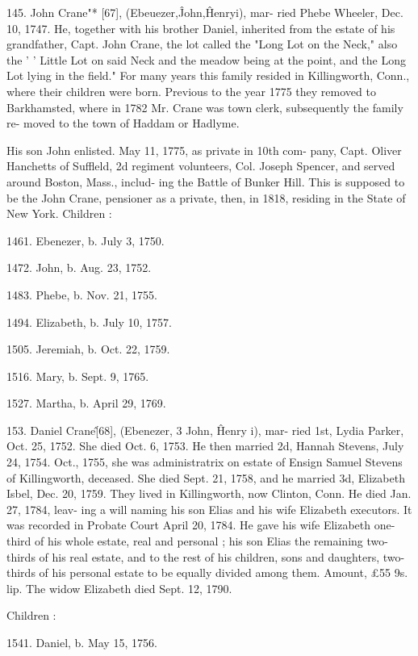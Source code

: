145. John Crane"* [67], (Ebeuezer,\^ John,\^ Henryi), mar- 
ried Phebe Wheeler, Dec. 10, 1747. He, together with his brother 
Daniel, inherited from the estate of his grandfather, Capt. John 
Crane, the lot called the "Long Lot on the Neck," also the 
' ' Little Lot on said Neck and the meadow being at the point, and 
the Long Lot lying in the field." For many years this family 
resided in Killingworth, Conn., where their children were born. 
Previous to the year 1775 they removed to Barkhamsted, where 
in 1782 Mr. Crane was town clerk, subsequently the family re- 
moved to the town of Haddam or Hadlyme. 

His son John enlisted. May 11, 1775, as private in 10th com- 
pany, Capt. Oliver Hanchetts of Suffleld, 2d regiment volunteers, 
Col. Joseph Spencer, and served around Boston, Mass., includ- 
ing the Battle of Bunker Hill. This is supposed to be the John 
Crane, pensioner as a private, then, in 1818, residing in the State 
of New York. Children : 

1461. Ebenezer, b. July 3, 1750. 

1472. John, b. Aug. 23, 1752. 

1483. Phebe, b. Nov. 21, 1755. 

1494. Elizabeth, b. July 10, 1757. 

1505. Jeremiah, b. Oct. 22, 1759. 

1516. Mary, b. Sept. 9, 1765. 

1527. Martha, b. April 29, 1769. 

153. Daniel Crane\^ [68], (Ebenezer, 3 John, \^ Henry i), mar- 
ried 1st, Lydia Parker, Oct. 25, 1752. She died Oct. 6, 1753. 
He then married 2d, Hannah Stevens, July 24, 1754. Oct., 
1755, she was administratrix on estate of Ensign Samuel Stevens 
of Killingworth, deceased. She died Sept. 21, 1758, and he 
married 3d, Elizabeth Isbel, Dec. 20, 1759. They lived in 
Killingworth, now Clinton, Conn. He died Jan. 27, 1784, leav- 
ing a will naming his son Elias and his wife Elizabeth executors. 
It was recorded in Probate Court April 20, 1784. He gave his 
wife Elizabeth one-third of his whole estate, real and personal ; 
his son Elias the remaining two-thirds of his real estate, and to 
the rest of his children, sons and daughters, two-thirds of his 
personal estate to be equally divided among them. Amount, 
£55 9s. lip. The widow Elizabeth died Sept. 12, 1790. 

Children : 

1541. Daniel, b. May 15, 1756. 

